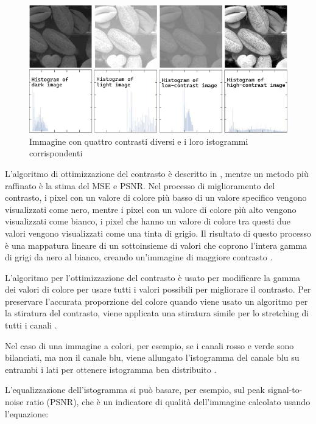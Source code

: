 \begin{figure}[ht]
    \centering
    \includegraphics[width=1\textwidth]{preprocessing/histogram-contrast.pdf}
    \caption{Immagine con quattro contrasti diversi e i loro istogrammi corrispondenti}
    \label{fig:histogram-contrast}
\end{figure}

L'algoritmo di ottimizzazione del contrasto è descritto in \cite{gonzalez_dip}, mentre un metodo più raffinato è la stima del MSE e PSNR. Nel processo di miglioramento del contrasto, i pixel con
un valore di colore più basso di un valore specifico vengono visualizzati come
nero, mentre i pixel con un valore di colore più alto vengono
visualizzati come bianco, i pixel che hanno un valore di colore tra questi due valori vengono visualizzati come una tinta di grigio.
Il risultato di questo processo è una mappatura lineare di un
sottoinsieme di valori che coprono l'intera gamma di grigi da
nero al bianco, creando un'immagine di maggiore contrasto \cite{sunaryo_preprocessing}. 

L'algoritmo per l'ottimizzazione del contrasto è usato per modificare
la gamma dei valori di colore per usare tutti i valori possibili per
migliorare il contrasto. Per preservare l'accurata proporzione del colore
quando viene usato un algoritmo per la  stiratura del contrasto,
viene applicata una stiratura simile per lo stretching di tutti i canali \cite{sunaryo_preprocessing}. 

Nel caso di una immagine a colori, per esempio, se i canali rosso e verde sono bilanciati, ma non il canale blu, viene allungato l'istogramma del canale blu su entrambi i lati per ottenere
istogramma ben distribuito \cite{sunaryo_preprocessing}.

L'equalizzazione dell'istogramma si può basare, per esempio, sul peak signal-to-noise ratio (PSNR), che è un indicatore di qualità dell'immagine  calcolato usando l'equazione:

